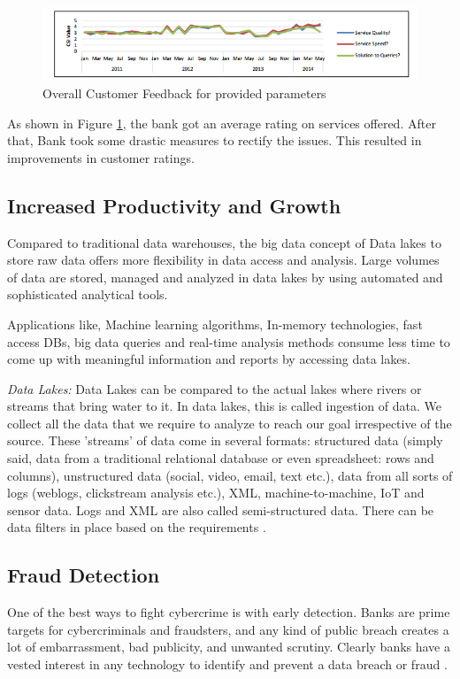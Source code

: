 \documentclass[sigconf]{acmart}
\begin{document}
\begin{figure}[htb]
  \centering
  \includegraphics[width=1.0\textwidth]{images/Figure2.png}
  \caption{Overall Customer Feedback for provided parameters 
  \cite{bigdata-banking}}
  \label{fig:Figure2} 
\end{figure}

As shown in Figure \ref{fig:Figure2}, the bank got an average rating on services offered. After that, Bank took some drastic measures to rectify the issues. This resulted in improvements in customer ratings.

\subsection{Increased Productivity and Growth}
Compared to traditional data warehouses, the big data concept of Data lakes to store raw data offers more flexibility in data access and analysis. Large volumes of data are stored, managed and analyzed in data lakes  by using automated and sophisticated analytical tools. 

Applications like, Machine learning algorithms, In-memory technologies, fast access DBs, big data queries and real-time analysis methods consume less time to come up with meaningful information and reports by accessing data lakes.

\textit{Data Lakes:} Data Lakes can be compared to the actual lakes where rivers or streams that bring water to it. In data lakes, this is called ingestion of data. We collect all the data that we require to analyze to reach our goal irrespective of the source. These 'streams' of data come in several formats: structured data (simply said, data from a traditional relational database or even spreadsheet: rows and columns), unstructured data (social, video, email, text etc.), data from all sorts of logs (weblogs, clickstream analysis etc.), XML, machine-to-machine, IoT and sensor data. Logs and XML are also called semi-structured data. There can be data filters in place based on the requirements \cite{data-lakes}.

\subsection{Fraud Detection}
One of the best ways to fight cybercrime is with early detection. Banks are prime targets for cybercriminals and fraudsters, and any kind of public breach creates a lot of embarrassment, bad publicity, and unwanted scrutiny. Clearly banks have a vested interest in any technology to identify and prevent a data breach or fraud \cite{the-top-5-trends-for-big-data-in-financial-services}.
\end{document}
